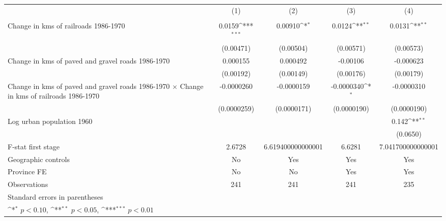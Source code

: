{
\def\sym#1{\ifmmode^{#1}\else\(^{#1}\)\fi}
\begin{tabular}{l*{4}{c}}
\hline\hline
                &\multicolumn{1}{c}{(1)}&\multicolumn{1}{c}{(2)}&\multicolumn{1}{c}{(3)}&\multicolumn{1}{c}{(4)}\\
                &\multicolumn{1}{c}{}&\multicolumn{1}{c}{}&\multicolumn{1}{c}{}&\multicolumn{1}{c}{}\\
\hline
Change in kms of railroads 1986-1970&   0.0159\sym{***}&  0.00910\sym{*}  &   0.0124\sym{**} &   0.0131\sym{**} \\
                &(0.00471)         &(0.00504)         &(0.00571)         &(0.00573)         \\
[1em]
Change in kms of paved and gravel roads 1986-1970& 0.000155         & 0.000492         & -0.00106         &-0.000623         \\
                &(0.00192)         &(0.00149)         &(0.00176)         &(0.00179)         \\
[1em]
Change in kms of paved and gravel roads 1986-1970 $\times$ Change in kms of railroads 1986-1970&-0.0000260         &-0.0000159         &-0.0000340\sym{*}  &-0.0000310         \\
                &(0.0000259)         &(0.0000171)         &(0.0000190)         &(0.0000190)         \\
[1em]
Log urban population 1960&                  &                  &                  &    0.142\sym{**} \\
                &                  &                  &                  & (0.0650)         \\
\hline
F-stat first stage&   2.6728         &6.619400000000001         &   6.6281         &7.041700000000001         \\
Geographic controls&       No         &      Yes         &      Yes         &      Yes         \\
Province FE     &       No         &       No         &      Yes         &      Yes         \\
Observations    &      241         &      241         &      241         &      235         \\
\hline\hline
\multicolumn{5}{l}{\footnotesize Standard errors in parentheses}\\
\multicolumn{5}{l}{\footnotesize \sym{*} \(p<0.10\), \sym{**} \(p<0.05\), \sym{***} \(p<0.01\)}\\
\end{tabular}
}
